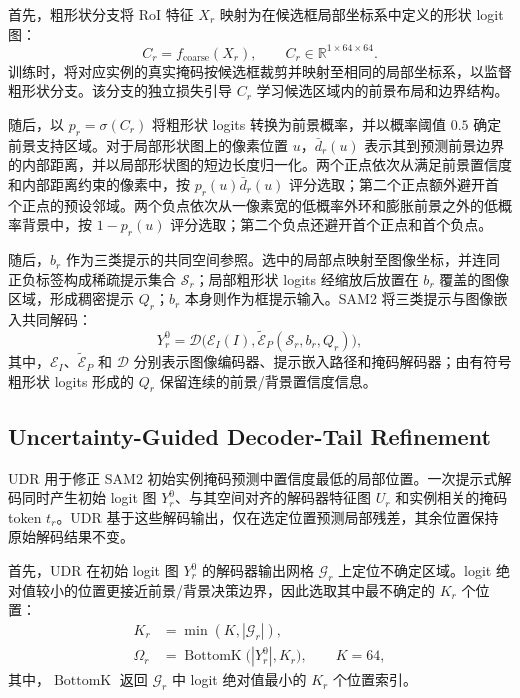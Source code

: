 \documentclass{article}
\begin{document}
\indent 首先，粗形状分支将 RoI 特征 $X_r$ 映射为在候选框局部坐标系中定义的形状 logit 图：
\begin{equation}
C_r=f_{\mathrm{coarse}}(X_r),\qquad C_r\in\mathbb{R}^{1\times64\times64}.
\label{eq:coarse}
\end{equation}
\indent 训练时，将对应实例的真实掩码按候选框裁剪并映射至相同的局部坐标系，以监督粗形状分支。该分支的独立损失引导 $C_r$ 学习候选区域内的前景布局和边界结构。

\indent 随后，以 $p_r=\sigma(C_r)$ 将粗形状 logits 转换为前景概率，并以概率阈值 $0.5$ 确定前景支持区域。对于局部形状图上的像素位置 $u$，$\bar d_r(u)$ 表示其到预测前景边界的内部距离，并以局部形状图的短边长度归一化。两个正点依次从满足前景置信度和内部距离约束的像素中，按 $p_r(u)\bar d_r(u)$ 评分选取；第二个正点额外避开首个正点的预设邻域。两个负点依次从一像素宽的低概率外环和膨胀前景之外的低概率背景中，按 $1-p_r(u)$ 评分选取；第二个负点还避开首个正点和首个负点。

\indent 随后，$b_r$ 作为三类提示的共同空间参照。选中的局部点映射至图像坐标，并连同正负标签构成稀疏提示集合 $\mathcal{S}_r$；局部粗形状 logits 经缩放后放置在 $b_r$ 覆盖的图像区域，形成稠密提示 $Q_r$；$b_r$ 本身则作为框提示输入。SAM2 将三类提示与图像嵌入共同解码：
\begin{equation}
Y_r^0=\mathcal{D}\bigl(\mathcal{E}_I(I),
\widetilde{\mathcal{E}}_P(\mathcal{S}_r,b_r,Q_r)\bigr),
\label{eq:native-decoding}
\end{equation}
\indent 其中，$\mathcal{E}_I$、$\widetilde{\mathcal{E}}_P$ 和 $\mathcal{D}$ 分别表示图像编码器、提示嵌入路径和掩码解码器；由有符号粗形状 logits 形成的 $Q_r$ 保留连续的前景/背景置信度信息。

\subsection{Uncertainty-Guided Decoder-Tail Refinement}
UDR 用于修正 SAM2 初始实例掩码预测中置信度最低的局部位置。一次提示式解码同时产生初始 logit 图 $Y_r^0$、与其空间对齐的解码器特征图 $U_r$ 和实例相关的掩码 token $t_r$。UDR 基于这些解码输出，仅在选定位置预测局部残差，其余位置保持原始解码结果不变。

\indent 首先，UDR 在初始 logit 图 $Y_r^0$ 的解码器输出网格 $\mathcal{G}_r$ 上定位不确定区域。logit 绝对值较小的位置更接近前景/背景决策边界，因此选取其中最不确定的 $K_r$ 个位置：
\begin{equation}
\begin{aligned}
K_r&=\min(K,|\mathcal{G}_r|),\\
\Omega_r&=\operatorname{BottomK}\bigl(|Y_r^0|,K_r\bigr),\qquad K=64,
\end{aligned}
\label{eq:udpr-selection}
\end{equation}
\indent 其中，$\operatorname{BottomK}$ 返回 $\mathcal{G}_r$ 中 logit 绝对值最小的 $K_r$ 个位置索引。
\end{document}
